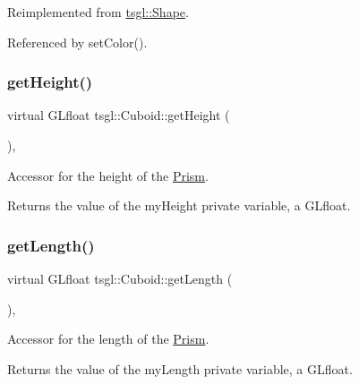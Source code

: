 Reimplemented from \hyperlink{classtsgl_1_1_shape_a6f54fe4d049f69a287edf8335a9509f8}{tsgl\+::\+Shape}.



Referenced by set\+Color().

\mbox{\label{classtsgl_1_1_cuboid_a4703e0321f31b4757673c8faf7b2b8df}} 
\subsubsection{\texorpdfstring{get\+Height()}{getHeight()}}
{\footnotesize\ttfamily virtual G\+Lfloat tsgl\+::\+Cuboid\+::get\+Height (\begin{DoxyParamCaption}{ }\end{DoxyParamCaption})\hspace{0.3cm}{\ttfamily [inline]}, {\ttfamily [virtual]}}



Accessor for the height of the \hyperlink{classtsgl_1_1_prism}{Prism}. 

Returns the value of the my\+Height private variable, a G\+Lfloat. \mbox{\label{classtsgl_1_1_cuboid_ae7780009759998eb7763d9f885e8e2b8}} 
\subsubsection{\texorpdfstring{get\+Length()}{getLength()}}
{\footnotesize\ttfamily virtual G\+Lfloat tsgl\+::\+Cuboid\+::get\+Length (\begin{DoxyParamCaption}{ }\end{DoxyParamCaption})\hspace{0.3cm}{\ttfamily [inline]}, {\ttfamily [virtual]}}



Accessor for the length of the \hyperlink{classtsgl_1_1_prism}{Prism}. 

Returns the value of the my\+Length private variable, a G\+Lfloat. \mbox{\label{classtsgl_1_1_cuboid_a6f5084919851fa715c931b8382a34d6c}} 
